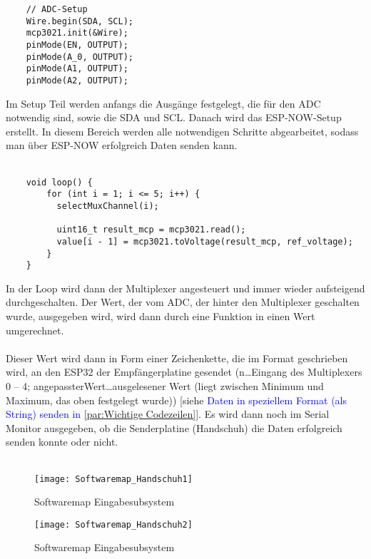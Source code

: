 \documentclass[titlepage,12pt,twoside]{article}
\begin{document}
\footnotesize
\begin{lstlisting}
	// ADC-Setup
	Wire.begin(SDA, SCL);
	mcp3021.init(&Wire);
	pinMode(EN, OUTPUT);
	pinMode(A_0, OUTPUT);
	pinMode(A1, OUTPUT);
	pinMode(A2, OUTPUT);		  
\end{lstlisting}
\hfill \break
\normalsize
Im Setup Teil werden anfangs die Ausgänge festgelegt, die für den ADC notwendig sind, sowie die SDA und SCL. Danach wird das 
ESP-NOW-Setup erstellt. In diesem Bereich werden alle notwendigen Schritte abgearbeitet, sodass man über ESP-NOW erfolgreich 
Daten senden kann. \\
\\
\footnotesize
\begin{lstlisting}
	void loop() {
		for (int i = 1; i <= 5; i++) {
		  selectMuxChannel(i);
	  
		  uint16_t result_mcp = mcp3021.read();
		  value[i - 1] = mcp3021.toVoltage(result_mcp, ref_voltage);	
		}
	}			
\end{lstlisting}
\hfill \break
\normalsize
In der Loop wird dann der Multiplexer angesteuert und immer wieder aufsteigend durchgeschalten. Der Wert, der vom ADC, der
hinter den Multiplexer geschalten wurde, ausgegeben wird, wird dann durch eine Funktion in einen Wert umgerechnet. \\
\\
Dieser Wert wird dann in Form einer Zeichenkette, die im Format  geschrieben wird, an den ESP32 der 
Empfängerplatine gesendet (n…Eingang des Multiplexers 0 – 4; angepassterWert…ausgelesener Wert (liegt zwischen Minimum und 
Maximum, das oben festgelegt wurde)) [siehe \textcolor{blue}{Daten in speziellem Format (als String) senden in \autoref{par:Wichtige Codezeilen}}]. Es wird dann noch im Serial Monitor ausgegeben, ob die Senderplatine (Handschuh) die 
Daten erfolgreich senden konnte oder nicht. \\
\\
\begin{figure}[H]
	\begin{center}
		\scalebox{1.2}
		{\texttt{[image: Softwaremap\_Handschuh1]}}
		\caption{Softwaremap Eingabesubsystem}
		\label{fig:Softwaremap_Handschuh}			
	\end{center}
\end{figure}
\begin{figure}[H]
	\begin{center}
		\scalebox{1.2}
		{\texttt{[image: Softwaremap\_Handschuh2]}}
		\caption{Softwaremap Eingabesubsystem}
		\label{fig:Softwaremap_Handschuh}			
	\end{center}
\end{figure}
\end{document}
